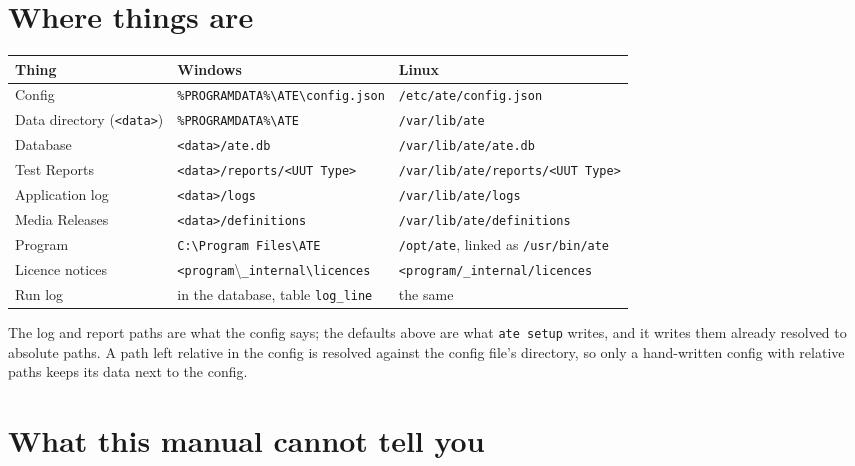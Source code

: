\section{Where things are}

\begin{center}
\footnotesize
\begin{tabular}{@{}>{\raggedright\arraybackslash}p{4.0cm}>{\raggedright\arraybackslash}p{5.4cm}>{\raggedright\arraybackslash}p{6.0cm}@{}}
\toprule
Thing & Windows & Linux \\
\midrule
Config & \texttt{\%PROGRAMDATA\%\textbackslash ATE}\allowbreak\texttt{\textbackslash config.json} & \texttt{/etc/ate/config.json} \\
Data directory (\texttt{<data>}) & \texttt{\%PROGRAMDATA\%\textbackslash ATE} & \texttt{/var/lib/ate} \\
Database & \texttt{<data>/ate.db} & \texttt{/var/lib/ate/ate.db} \\
Test Reports & \texttt{<data>/reports/}\allowbreak\texttt{<UUT Type>} & \texttt{/var/lib/ate/reports/}\allowbreak\texttt{<UUT Type>} \\
Application log & \texttt{<data>/logs} & \texttt{/var/lib/ate/logs} \\
Media Releases & \texttt{<data>/definitions} & \texttt{/var/lib/ate/definitions} \\
Program & \texttt{C:\textbackslash Program Files\textbackslash ATE} & \texttt{/opt/ate}, linked as \texttt{/usr/bin/ate} \\
Licence notices & \texttt{<program}\textbackslash\texttt{\_internal}\allowbreak\texttt{\textbackslash licences} & \texttt{<program/\_internal/}\allowbreak\texttt{licences} \\
Run log & in the database, table \texttt{log\_line} & the same \\
\bottomrule
\end{tabular}
\end{center}

The log and report paths are what the config says; the defaults above are what \texttt{ate setup}
writes, and it writes them already resolved to absolute paths. A path left relative in the config is
resolved against the config file's directory, so only a hand-written config with relative paths keeps
its data next to the config.

\section{What this manual cannot tell you}

